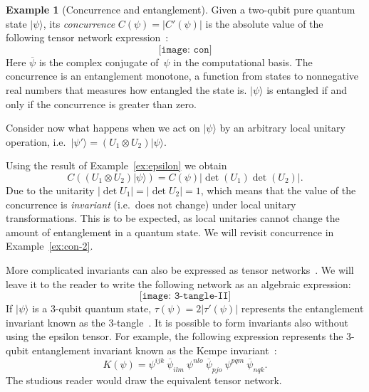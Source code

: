 \documentclass[aps,pra,12pt,nofootinbib,superscriptaddress,longbibliography]{revtex4-1}
\newcommand{\vb}[1]{}
\theoremstyle{plain}
\theoremstyle{definition}
\newtheorem{example}[theorem]{Example}
\newcommand{\ket}[1]{\mbox{$|#1\rangle$}}
\newcommand{\be}{\begin{equation}}
\newcommand{\ee}{\end{equation}}
\begin{document}
\begin{example}[Concurrence and entanglement]\label{ex:concurrence}
Given a two-qubit pure quantum state $\ket{\psi}$,
its \emph{concurrence}
$C(\psi) = |C'(\psi)|$
is the absolute value of the following tensor network expression~\cite{concurrence}:
\be\label{fig:con}
 \texttt{[image: con]}
\ee
Here $\overline{\psi}$ is the complex conjugate of~$\psi$ in the computational basis.
The concurrence is an entanglement monotone, a function from states to
nonnegative real numbers that measures how entangled the state is.
$\ket{\psi}$ is entangled if and only if
the concurrence is greater than zero.

Consider now what happens when we act on $\ket{\psi}$ by an arbitrary local unitary operation, i.e.~$\ket{\psi'} = (U_1 \otimes U_2) \ket{\psi}$.
\vb{We haven't yet shown how wires are bent!}
Using the result of Example~\ref{ex:epsilon} we obtain
\be
C\left((U_1\otimes U_2) \ket{\psi}\right) = C(\psi) |\det(U_1) \det(U_2)|.
\ee
Due to the unitarity $|\det U_1| = |\det U_2| = 1$, which means that the value of the concurrence
is \emph{invariant} (i.e.~does not change) under local unitary transformations.
This is to be expected, as local unitaries cannot change the amount of entanglement in a quantum state.
We will revisit concurrence in Example~\ref{ex:con-2}.

More complicated invariants can also be expressed as tensor networks~\cite{2013JPhA...46U5301B}.
We will leave it to the reader to write the following network as an algebraic expression:
\be
 \texttt{[image: 3-tangle-II]}
\ee
If $\ket{\psi}$ is a 3-qubit quantum state,
$\tau(\psi) = 2 |\tau'(\psi)|$ represents the entanglement invariant known as the 3-tangle~\cite{2000PhRvA..61e2306C}.
It is possible to form invariants also without using the epsilon tensor.  For example,
the following expression represents the 3-qubit entanglement invariant known as the Kempe invariant~\cite{kempe}:
\begin{equation}\label{eqn:kempe}
K(\psi) = \psi^{ijk}~\overline{\psi}_{ilm}~\psi^{nlo}~\overline{\psi}_{pjo}~\psi^{pqm}~\overline{\psi}_{nqk}.
\end{equation}
The studious reader would draw the equivalent tensor network.
\end{example}
\end{document}
